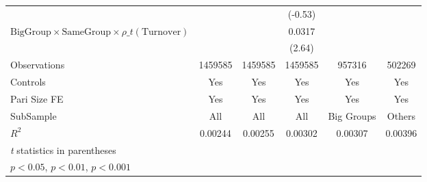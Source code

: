 {\begin{tabular}{l*{5}{c}}
                &                  &                  &  (-0.53)         &                  &                  \\
[1em]
$ {\text{BigGroup}}\times{\text{SameGroup}}\times  {\rho\_t(\text{Turnover})}$ &                  &                  &   0.0317\sym{*}  &                  &                  \\
                &                  &                  &   (2.64)         &                  &                  \\
\hline
Observations    &  1459585         &  1459585         &  1459585         &   957316         &   502269         \\
Controls        &      Yes         &      Yes         &      Yes         &      Yes         &      Yes         \\
Pari Size FE    &      Yes         &      Yes         &      Yes         &      Yes         &      Yes         \\
SubSample       &      All         &      All         &      All         &Big Groups         &   Others         \\
$ R^2$          &  0.00244         &  0.00255         &  0.00302         &  0.00307         &  0.00396         \\
\hline\hline
\multicolumn{6}{l}{\footnotesize \textit{t} statistics in parentheses}\\
\multicolumn{6}{l}{\footnotesize \sym{*} \(p<0.05\), \sym{**} \(p<0.01\), \sym{***} \(p<0.001\)}\\
\end{tabular}
}
